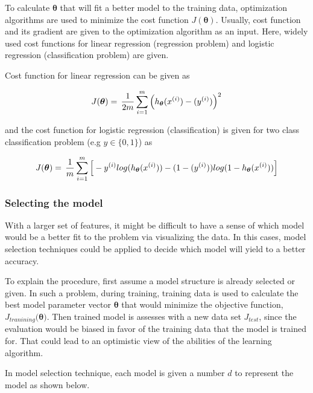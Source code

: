 To calculate $\bm{\theta}$ that will fit a better model to the training data, optimization algorithms are used to minimize the cost function $J({\bm{\theta}})$.
Usually, cost function and its gradient are given to the optimization algorithm as an input. 
Here, widely used cost functions for linear regression (regression problem) and logistic regression (classification problem) are given. 

Cost function for linear regression can be given as

\begin{equation}{\label{eqn:costFuncLinearRegression}}
J({\bm{\theta}})
=\,
\frac{1}{2m} \sum\limits_{i=1}^{m} \Big(h_{\bm{\theta}}(x^{(i)}) - (y^{(i)})\Big)^2  
\end{equation} 

and the cost function for logistic regression (classification) is given for two class classification problem (e.g $y \in \{0,1\}$) as 

\begin{equation}{\label{eqn:costFuncLogisticRegression}}
J({\bm{\theta}})
=\,
\frac{1}{m} \sum\limits_{i=1}^{m} \Big[-y^{(i)}log(h_{\bm{\theta}}(x^{(i)})) - (1-(y^{(i)}))log(1-h_{\bm{\theta}}(x^{(i)}))\Big]
\end{equation} 


\subsubsection{Selecting the model}

With a larger set of features, it might be difficult to have a sense of which model would be a better fit to the problem via visualizing the data. 
In this cases, model selection techniques could be applied to decide which model will yield to a better accuracy.

To explain the procedure, first assume a model structure is already selected or given. 
In such a problem, during training, training data is used to calculate the best model parameter vector $\bm{\theta}$ that would minimize the objective function, $J_{tranining}(\bm{\theta)}$.
Then trained model is assesses with a new data set $J_{test}$, since the evaluation would be biased in favor of the training data that the model is trained for. 
That could lead to an optimistic view of the abilities of the learning algorithm. 

In model selection technique, each model is given a number $d$ to represent the model as shown below.

